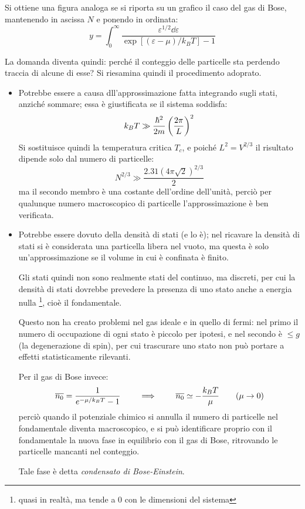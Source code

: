 Si ottiene una figura analoga se si riporta su un grafico il caso del gas di Bose, mantenendo in ascissa $ N $ e ponendo in ordinata:
\begin{equation*}
	y =  \int_{0}^{\infty}  \frac{\varepsilon^{1/2} \dd \varepsilon}{ \exp\left[(\varepsilon - \mu)/k_B T\right] - 1}
\end{equation*}

La domanda diventa quindi: perché il conteggio delle particelle sta perdendo traccia di alcune di esse? Si riesamina quindi il procedimento adoprato.
\begin{itemize}
	\item Potrebbe essere a causa dll'approssimazione fatta integrando sugli stati, anziché sommare; essa è giustificata se il sistema soddisfa:
	\begin{equation*}
		k_B T \gg \frac{\hbar^2}{2m} \left(\frac{2\pi}{L}\right)^2
	\end{equation*}
	Si sostituisce quindi la temperatura critica $ T_c $, e poiché $L^2 = V^{2/3}$ il risultato dipende solo dal numero di particelle:
	\begin{equation*}
	N^{2/3} \gg \frac{2.31(4\pi\sqrt{2})^{2/3}}{2}
	\end{equation*}
	ma il secondo membro è una costante dell'ordine dell'unità, perciò per qualunque numero macroscopico di particelle l'approssimazione è ben verificata.
	
	\item Potrebbe essere dovuto della densità di stati (e lo è); nel ricavare la densità di stati si è considerata una particella libera nel vuoto, ma questa è solo un'approssimazione se il volume in cui è confinata è finito.
	
	Gli stati quindi non sono realmente stati del continuo, ma discreti, per cui la densità di stati dovrebbe prevedere la presenza di uno stato anche a energia nulla \footnote{quasi in realtà, ma tende a $0$ con le dimensioni del sistema}, cioè il fondamentale. 
	
	Questo non ha creato problemi nel gas ideale e in quello di fermi: nel primo il numero di occupazione di ogni stato è piccolo per ipotesi, e nel secondo è $\leq g$ (la degenerazione di spin), per cui trascurare uno stato non può portare a effetti statisticamente rilevanti.
	
	Per il gas di Bose invece:
	\begin{equation*}
		\overline{n_0} = \frac{1}{e^{-\mu/k_B T} - 1} \qquad \implies \qquad \overline{n_0} \simeq - \frac{k_B T}{\mu} \qquad (\mu \rightarrow 0)
	\end{equation*}
	perciò quando il potenziale chimico si annulla il numero di particelle nel fondamentale diventa macroscopico, e si può identificare proprio con il fondamentale la nuova fase in equilibrio con il gas di Bose, ritrovando le particelle mancanti nel conteggio.
	
	Tale fase è detta \textit{condensato di Bose-Einstein}.
\end{itemize}

